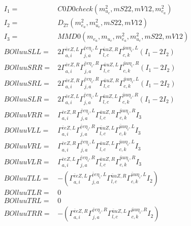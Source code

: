 \documentclass[A4,landscape]{article}
\begin{document}
\begin{align} 
I_1 = & C0D0check(m^2_{u_{{c}}}, mS22, mV12, m^2_{e_{{a}}}) \\ 
I_2 = & D_{27}(m^2_{e_{{a}}}, m^2_{u_{{c}}}, mS22, mV12) \\ 
I_3 = & MMD0(m_{e_{{a}}}, m_{u_{{c}}}, m^2_{e_{{a}}}, m^2_{u_{{c}}}, mS22, mV12) \\ 
  BOlluuSLL= & 2  \Gamma^{\bar{e}e Z ,L}_{a, i} \Gamma^{\bar{e}e \eta_i ,L}_{j, a} \Gamma^{\bar{u}u Z ,R}_{l, c} \Gamma^{\bar{u}u \eta_i ,L}_{c, k} (I_1 - 2 I_2) \\ 
  BOlluuSRR= & 2  \Gamma^{\bar{e}e Z ,R}_{a, i} \Gamma^{\bar{e}e \eta_i ,R}_{j, a} \Gamma^{\bar{u}u Z ,L}_{l, c} \Gamma^{\bar{u}u \eta_i ,R}_{c, k} (I_1 - 2 I_2) \\ 
  BOlluuSRL= & 2  \Gamma^{\bar{e}e Z ,R}_{a, i} \Gamma^{\bar{e}e \eta_i ,R}_{j, a} \Gamma^{\bar{u}u Z ,R}_{l, c} \Gamma^{\bar{u}u \eta_i ,L}_{c, k} (I_1 - 2 I_2) \\ 
  BOlluuSLR= & 2  \Gamma^{\bar{e}e Z ,L}_{a, i} \Gamma^{\bar{e}e \eta_i ,L}_{j, a} \Gamma^{\bar{u}u Z ,L}_{l, c} \Gamma^{\bar{u}u \eta_i ,R}_{c, k} (I_1 - 2 I_2) \\ 
  BOlluuVRR= &  \Gamma^{\bar{e}e Z ,R}_{a, i} \Gamma^{\bar{e}e \eta_i ,L}_{j, a} \Gamma^{\bar{u}u Z ,R}_{l, c} \Gamma^{\bar{u}u \eta_i ,R}_{c, k} I_3 \\ 
  BOlluuVLL= &  \Gamma^{\bar{e}e Z ,L}_{a, i} \Gamma^{\bar{e}e \eta_i ,R}_{j, a} \Gamma^{\bar{u}u Z ,L}_{l, c} \Gamma^{\bar{u}u \eta_i ,L}_{c, k} I_3 \\ 
  BOlluuVRL= &  \Gamma^{\bar{e}e Z ,R}_{a, i} \Gamma^{\bar{e}e \eta_i ,L}_{j, a} \Gamma^{\bar{u}u Z ,L}_{l, c} \Gamma^{\bar{u}u \eta_i ,L}_{c, k} I_3 \\ 
  BOlluuVLR= &  \Gamma^{\bar{e}e Z ,L}_{a, i} \Gamma^{\bar{e}e \eta_i ,R}_{j, a} \Gamma^{\bar{u}u Z ,R}_{l, c} \Gamma^{\bar{u}u \eta_i ,R}_{c, k} I_3 \\ 
  BOlluuTLL= & -( \Gamma^{\bar{e}e Z ,L}_{a, i} \Gamma^{\bar{e}e \eta_i ,L}_{j, a} \Gamma^{\bar{u}u Z ,R}_{l, c} \Gamma^{\bar{u}u \eta_i ,L}_{c, k} I_2) \\ 
  BOlluuTLR= & 0 \\ 
  BOlluuTRL= & 0 \\ 
  BOlluuTRR= & -( \Gamma^{\bar{e}e Z ,R}_{a, i} \Gamma^{\bar{e}e \eta_i ,R}_{j, a} \Gamma^{\bar{u}u Z ,L}_{l, c} \Gamma^{\bar{u}u \eta_i ,R}_{c, k} I_2) \\ 
\end{align} 
\end{document}
